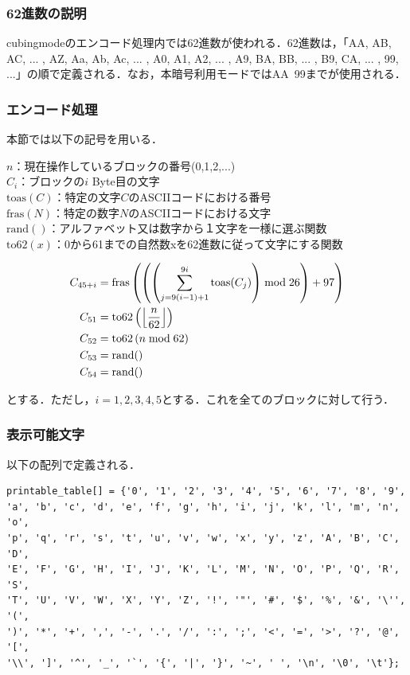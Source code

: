 \documentclass{jsarticle}
\begin{document}
\subsubsection{62進数の説明}
cubingmodeのエンコード処理内では62進数が使われる．62進数は，「AA, AB, AC, ... , AZ, Aa, Ab, Ac, ... , A0, A1, A2, ... , A9, BA, BB, ... , B9, CA, ... , 99, ...」の順で定義される．なお，本暗号利用モードではAA~99までが使用される．

\subsubsection{エンコード処理}
本節では以下の記号を用いる．

\(n\)：現在操作しているブロックの番号(0,1,2,...)\\
\(C_i\)：ブロックの\(i\) Byte目の文字\\
\(\mathrm{toas}(C)\)：特定の文字\(C\)のASCIIコードにおける番号\\
\(\mathrm{fras}(N)\)：特定の数字\(N\)のASCIIコードにおける文字\\
\(\mathrm{rand}()\)：アルファベット又は数字から１文字を一様に選ぶ関数\\
\(\mathrm{to62}(x)\)：0から61までの自然数xを62進数に従って文字にする関数

\begin{align}
C_{45+i} &= \mathrm{fras}\left(\left(\left(\sum_{j=9(i-1)+1}^{9i}{\mathrm{toas}(C_j)}\right)\bmod 26\right)+97\right) \notag\\
C_{51} &= \mathrm{to62}\left (\left \lfloor\frac{n}{62}\right \rfloor \right) \notag\\
C_{52} &= \mathrm{to62}\left ( n \bmod 62 \right) \notag\\
C_{53} &= \mathrm{rand}() \notag\\
C_{54} &= \mathrm{rand}() \notag\\
\end{align}

とする．ただし，\(i=1,2,3,4,5\)とする．これを全てのブロックに対して行う．

\subsubsection{表示可能文字}
以下の配列で定義される．
\begin{verbatim}
printable_table[] = {'0', '1', '2', '3', '4', '5', '6', '7', '8', '9', 
'a', 'b', 'c', 'd', 'e', 'f', 'g', 'h', 'i', 'j', 'k', 'l', 'm', 'n', 'o',
'p', 'q', 'r', 's', 't', 'u', 'v', 'w', 'x', 'y', 'z', 'A', 'B', 'C', 'D',
'E', 'F', 'G', 'H', 'I', 'J', 'K', 'L', 'M', 'N', 'O', 'P', 'Q', 'R', 'S',
'T', 'U', 'V', 'W', 'X', 'Y', 'Z', '!', '"', '#', '$', '%', '&', '\'', '(',
')', '*', '+', ',', '-', '.', '/', ':', ';', '<', '=', '>', '?', '@', '[', 
'\\', ']', '^', '_', '`', '{', '|', '}', '~', ' ', '\n', '\0', '\t'};
\end{verbatim}
\end{document}
